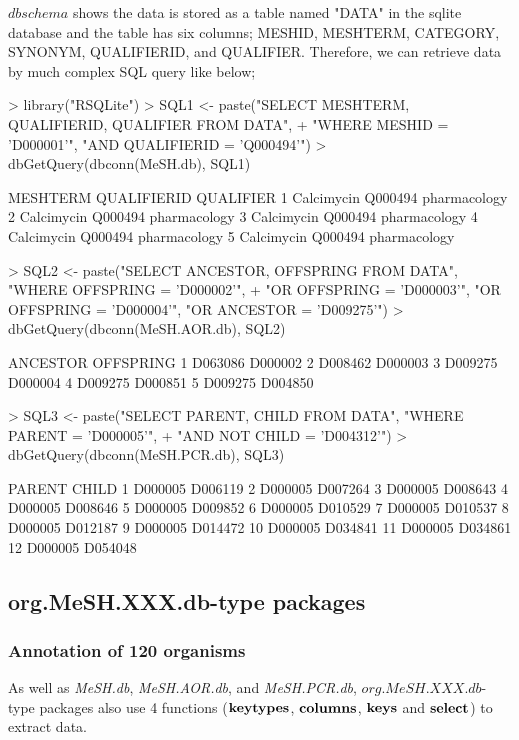 \documentclass[11pt]{article}
\newcommand{\Rpackage}[1]{{\textit{#1}}}
\begin{document}
$dbschema$ shows the data is stored as a table named "DATA" in the sqlite database and the table has six columns; MESHID, MESHTERM, CATEGORY, SYNONYM, QUALIFIERID, and QUALIFIER. Therefore, we can retrieve data by much complex SQL query like below;
\begin{center}
\begin{Schunk}
\begin{Sinput}
> library("RSQLite")
> SQL1 <- paste("SELECT MESHTERM, QUALIFIERID, QUALIFIER FROM DATA", 
+     "WHERE MESHID = 'D000001'", "AND QUALIFIERID = 'Q000494'")
> dbGetQuery(dbconn(MeSH.db), SQL1)
\end{Sinput}
\begin{Soutput}
    MESHTERM QUALIFIERID    QUALIFIER
1 Calcimycin     Q000494 pharmacology
2 Calcimycin     Q000494 pharmacology
3 Calcimycin     Q000494 pharmacology
4 Calcimycin     Q000494 pharmacology
5 Calcimycin     Q000494 pharmacology
\end{Soutput}
\begin{Sinput}
> SQL2 <- paste("SELECT ANCESTOR, OFFSPRING FROM DATA", "WHERE OFFSPRING = 'D000002'", 
+     "OR OFFSPRING = 'D000003'", "OR OFFSPRING = 'D000004'", "OR ANCESTOR = 'D009275'")
> dbGetQuery(dbconn(MeSH.AOR.db), SQL2)
\end{Sinput}
\begin{Soutput}
  ANCESTOR OFFSPRING
1  D063086   D000002
2  D008462   D000003
3  D009275   D000004
4  D009275   D000851
5  D009275   D004850
\end{Soutput}
\begin{Sinput}
> SQL3 <- paste("SELECT PARENT, CHILD FROM DATA", "WHERE PARENT = 'D000005'", 
+     "AND NOT CHILD = 'D004312'")
> dbGetQuery(dbconn(MeSH.PCR.db), SQL3)
\end{Sinput}
\begin{Soutput}
    PARENT   CHILD
1  D000005 D006119
2  D000005 D007264
3  D000005 D008643
4  D000005 D008646
5  D000005 D009852
6  D000005 D010529
7  D000005 D010537
8  D000005 D012187
9  D000005 D014472
10 D000005 D034841
11 D000005 D034861
12 D000005 D054048
\end{Soutput}
\end{Schunk}
\end{center}

\clearpage
\subsection{org.MeSH.XXX.db-type packages}
\subsubsection{Annotation of 120 organisms}
As well as \Rpackage{MeSH.db},  \Rpackage{MeSH.AOR.db}, and \Rpackage{MeSH.PCR.db}, $org.MeSH.XXX.db$-type packages also use 4 functions ($\bf{keytypes}$, $\bf{columns}$, $\bf{keys}$ and $\bf{select}$) to extract data.
\end{document}
